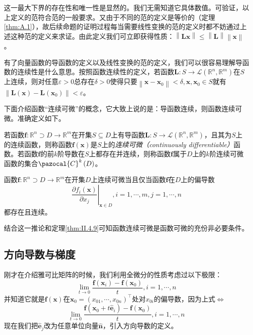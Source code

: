 \documentclass[../main.tex]{subfiles}
\begin{document}
这一最大下界的存在性和唯一性是显然的。我们无需知道它具体数值。可验证，以上定义的范符合范的一般要求。又由于不同的范的定义是等价的（定理\ref{thm:A.1}），故后续命题的证明过程每当需要线性变换的范的定义时都不妨通过上述这种范的定义来求证。由此定义我们可立即获得性质：$\left\|\mathbf{Lx}\right\|\leq\left\|\mathbf{L}\right\|\left\|\mathbf{x}\right\|$。

有了向量函数的导函数的定义以及线性变换的范的定义，我们可以很容易理解导函数的连续性是什么意思。按照函数连续性的定义，若函数$\mathbf{L}:S\rightarrow\mathcal{L}\left(\mathbb{R}^n,\mathbb{R}^m\right)$在$S$上连续，则对任意$\varepsilon>0$总存在$\delta>0$使得只要$\left\|\mathbf{x}-\mathbf{x}_0\right\|<\delta,\mathbf{x},\mathbf{x}_0\in S$就有$\left\|\mathbf{L}\left(\mathbf{x}\right)-\mathbf{L}\left(\mathbf{x}_0\right)\right\|<\varepsilon$。

下面介绍函数“连续可微”的概念，它大致上说的是：导函数连续，则函数连续可微。准确定义如下。

\begin{definition}[连续可微函数]\label{def:II.4.17}
    若函数$\mathbf{f}:\mathbb{R}^n\supset D\rightarrow\mathbb{R}^m$在开集$S\subseteq D$上有导函数$\mathbf{L}:S\rightarrow\mathcal{L}\left(\mathbb{R}^n,\mathbb{R}^m\right)$，且其为$S$上的连续函数，则称函数$\mathbf{f}\left(\mathbf{x}\right)$是$S$上的\emph{连续可微（continuously differentiable）}函数。若函数$\mathbf{f}$的前$k$阶导数在$S$上都存在并连续，则称函数$\mathbf{f}$属于$D$上的$k$阶连续可微函数的集合$\pazocal{C}^k\left(D\right)$。
\end{definition}

\begin{corollary}\label{cor:II.4.9.1}
    函数$\mathbf{f}:\mathbb{R}^n\supset D\rightarrow\mathbb{R}^m$在开集$D$上连续可微当且仅当函数$\mathbf{f}$在$D$上的偏导数
    \[
        \left.\frac{\partial f_i\left(\mathbf{x}\right)}{\partial x_j}\right|_{\mathbf{x}\in D},i=1,\cdots,m,j=1,\cdots,n
    \]
    都存在且连续。
\end{corollary}

结合这一推论和定理\ref{thm:II.4.9}可知函数连续可微是函数可微的充份非必要条件。

\subsection{方向导数与梯度}
刚才在介绍雅可比矩阵的时候，我们利用全微分的性质考虑过以下极限：
\[
    \lim_{t\to 0}\frac{\mathbf{f}\left(\mathbf{x}_i\right)-\mathbf{f}\left(\mathbf{x}_0\right)}{t},i=1,\cdots,n\]
并知道它就是$\mathbf{f}\left(\mathbf{x}\right)$在$\mathbf{x}_0=\left(x_{01},\cdots,x_{0n}\right)^\intercal$处对$x_{0i}$的偏导数，因为上式$\Leftrightarrow$
\[
    \lim_{t\rightarrow 0}\frac{\mathbf{f}\left(\mathbf{x}_0+t\mathbf{\hat{e}}_i\right)-\mathbf{f}\left(\mathbf{x}_0\right)}{t},i=1,\cdots,n
\]
现在我们把$\mathbf{\hat{e}}_j$改为任意单位向量$\mathbf{\hat{n}}$，引入方向导数的定义。
\end{document}
